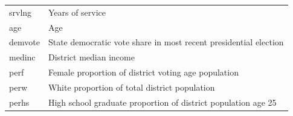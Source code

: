 \documentclass[]{book}
\begin{document}
\begin{longtable}[]{@{}ll@{}}
\begin{minipage}[t]{0.17\columnwidth}\raggedright\strut
srvlng\strut
\end{minipage} & \begin{minipage}[t]{0.67\columnwidth}\raggedright\strut
Years of service\strut
\end{minipage}\tabularnewline
\begin{minipage}[t]{0.17\columnwidth}\raggedright\strut
age\strut
\end{minipage} & \begin{minipage}[t]{0.67\columnwidth}\raggedright\strut
Age\strut
\end{minipage}\tabularnewline
\begin{minipage}[t]{0.17\columnwidth}\raggedright\strut
demvote\strut
\end{minipage} & \begin{minipage}[t]{0.67\columnwidth}\raggedright\strut
State democratic vote share in most recent presidential election\strut
\end{minipage}\tabularnewline
\begin{minipage}[t]{0.17\columnwidth}\raggedright\strut
medinc\strut
\end{minipage} & \begin{minipage}[t]{0.67\columnwidth}\raggedright\strut
District median income\strut
\end{minipage}\tabularnewline
\begin{minipage}[t]{0.17\columnwidth}\raggedright\strut
perf\strut
\end{minipage} & \begin{minipage}[t]{0.67\columnwidth}\raggedright\strut
Female proportion of district voting age population\strut
\end{minipage}\tabularnewline
\begin{minipage}[t]{0.17\columnwidth}\raggedright\strut
perw\strut
\end{minipage} & \begin{minipage}[t]{0.67\columnwidth}\raggedright\strut
White proportion of total district population\strut
\end{minipage}\tabularnewline
\begin{minipage}[t]{0.17\columnwidth}\raggedright\strut
perhs\strut
\end{minipage} & \begin{minipage}[t]{0.67\columnwidth}\raggedright\strut
High school graduate proportion of district population age 25\strut
\end{minipage}\tabularnewline

\end{longtable}
\end{document}

